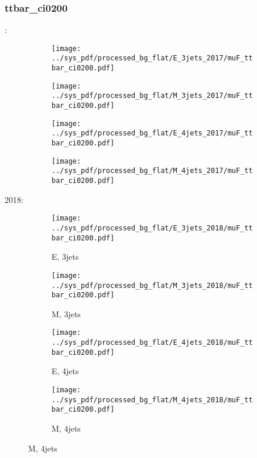 \documentclass{beamer}
\begin{document}
\begin{frame}
\frametitle{ttbar_ci0200}
\fontsize{5}{1}:
\begin{figure}
\centering
\begin{subfigure}[b]{0.24\textwidth}
\texttt{[image: ../sys\_pdf/processed\_bg\_flat/E\_3jets\_2017/muF\_ttbar\_ci0200.pdf]}
\end{subfigure}
\begin{subfigure}[b]{0.24\textwidth}
\texttt{[image: ../sys\_pdf/processed\_bg\_flat/M\_3jets\_2017/muF\_ttbar\_ci0200.pdf]}
\end{subfigure}
\begin{subfigure}[b]{0.24\textwidth}
\texttt{[image: ../sys\_pdf/processed\_bg\_flat/E\_4jets\_2017/muF\_ttbar\_ci0200.pdf]}
\end{subfigure}
\begin{subfigure}[b]{0.24\textwidth}
\texttt{[image: ../sys\_pdf/processed\_bg\_flat/M\_4jets\_2017/muF\_ttbar\_ci0200.pdf]}
\end{subfigure}
\end{figure}
2018:
\begin{figure}
\centering
\begin{subfigure}[b]{0.24\textwidth}
\texttt{[image: ../sys\_pdf/processed\_bg\_flat/E\_3jets\_2018/muF\_ttbar\_ci0200.pdf]}
\captionsetup{font=tiny}
\caption{E, 3jets}
\end{subfigure}
\begin{subfigure}[b]{0.24\textwidth}
\texttt{[image: ../sys\_pdf/processed\_bg\_flat/M\_3jets\_2018/muF\_ttbar\_ci0200.pdf]}
\captionsetup{font=tiny}
\caption{M, 3jets}
\end{subfigure}
\begin{subfigure}[b]{0.24\textwidth}
\texttt{[image: ../sys\_pdf/processed\_bg\_flat/E\_4jets\_2018/muF\_ttbar\_ci0200.pdf]}
\captionsetup{font=tiny}
\caption{E, 4jets}
\end{subfigure}
\begin{subfigure}[b]{0.24\textwidth}
\texttt{[image: ../sys\_pdf/processed\_bg\_flat/M\_4jets\_2018/muF\_ttbar\_ci0200.pdf]}
\captionsetup{font=tiny}
\caption{M, 4jets}
\end{subfigure}
\end{figure}
\end{frame}
\end{document}

